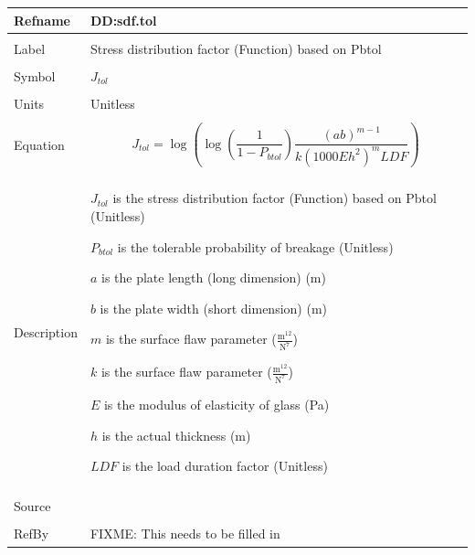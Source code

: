 \documentclass[12pt]{article}
\begin{document}
\noindent \begin{minipage}{\textwidth}
\begin{tabular}{p{} p{}}
\toprule \textbf{Refname} & \textbf{DD:sdf.tol}
\label{DD:sdf.tol}
\\ \midrule \\
Label & Stress distribution factor (Function) based on Pbtol
\\ \midrule \\
Symbol & ${J_{tol}}$
\\ \midrule \\
Units & Unitless
\\ \midrule \\
Equation & \begin{dmath}
           {J_{tol}}=\log\left(\log\left(\frac{1}{1-{P_{btol}}}\right) \frac{\left(a b\right)^{m-1}}{k \left(1000 E h^{2}\right)^{m} LDF}\right)
           \end{dmath}
\\ \midrule \\
Description & \begin{description}
              \item{${J_{tol}}$ is the stress distribution factor (Function) based on Pbtol (Unitless)}
              \item{${P_{btol}}$ is the tolerable probability of breakage (Unitless)}
              \item{$a$ is the plate length (long dimension) (m)}
              \item{$b$ is the plate width (short dimension) (m)}
              \item{$m$ is the surface flaw parameter ($\frac{\text{m}^{12}}{\text{N}^{7}}$)}
              \item{$k$ is the surface flaw parameter ($\frac{\text{m}^{12}}{\text{N}^{7}}$)}
              \item{$E$ is the modulus of elasticity of glass (Pa)}
              \item{$h$ is the actual thickness (m)}
              \item{$LDF$ is the load duration factor (Unitless)}
              \end{description}
\\ \midrule \\
Source & 
\\ \midrule \\
RefBy & FIXME: This needs to be filled in
\\ \bottomrule \end{tabular}
\end{minipage}\\
\end{document}
